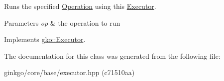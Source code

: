 Runs the specified \hyperlink{classgko_1_1Operation}{Operation} using this \hyperlink{classgko_1_1Executor}{Executor}. 


\begin{DoxyParams}{Parameters}
{\em op} & the operation to run \\
\hline
\end{DoxyParams}


Implements \hyperlink{classgko_1_1Executor_a1de8e2668b76e66690acf5eef9e8324d}{gko\+::\+Executor}.



The documentation for this class was generated from the following file\+:\begin{DoxyCompactItemize}
\item 
ginkgo/core/base/executor.\+hpp (c71510aa)\end{DoxyCompactItemize}
